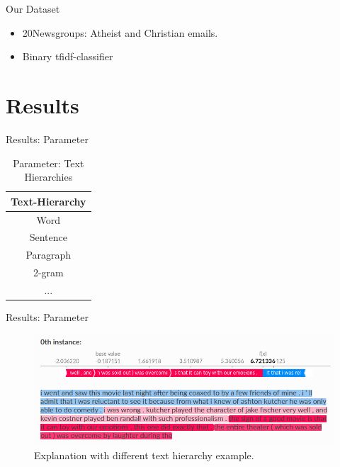 \documentclass[en]{sdqbeamer}
\begin{document}
\begin{large}
\begin{frame}{Our Dataset}
\begin{itemize}
    \item 20Newsgroups\cite{Newsgroups20}: Atheist and Christian emails.
    \item Binary tfidf-classifier
\end{itemize}

\end{frame}

\section{Results}

\begin{frame}[fragile]{Results: Parameter}
\begin{table}[H]
    \centering
    \begin{tabular}{c}
         \textbf{Text-Hierarchy}\\ \hline
         Word\\
         Sentence\\
         Paragraph\\
         2-gram\\
         ...
    \end{tabular}
    \caption{Parameter: Text Hierarchies}
    \label{tab:textHierarchies}
\end{table}
\end{frame}

\begin{frame}{Results: Parameter}
    \begin{figure}
        \centering
        \includegraphics[width=\linewidth,height=0.6\textheight,keepaspectratio]{images/Sentence_XAI.png}
        \caption{Explanation with different text hierarchy example\cite{shapDocs}.}
        \label{fig:SentenceExplanation}
    \end{figure}
\end{frame}


\end{large}
\end{document}
